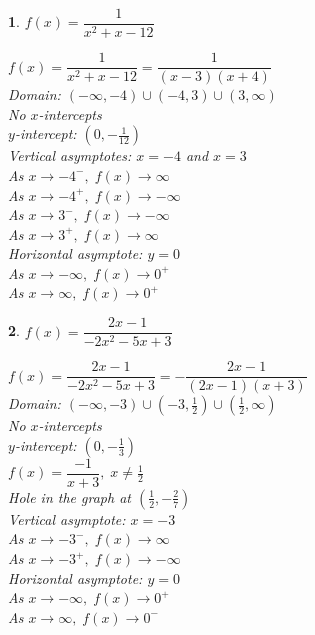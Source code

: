 \documentclass{amsbook}
\newtheorem{exc}{}
\newenvironment{ex}{\begin{exc}\normalfont}{\end{exc}}
\numberwithin{section}{chapter}
\numberwithin{equation}{chapter}
\begin{document}
\begin{multicols}{2}
\begin{ex}
	$f(x) = \dfrac{1}{x^{2} + x - 12}$
	\begin{sol}
		$f(x) = \dfrac{1}{x^{2} + x - 12} = \dfrac{1}{(x - 3)(x + 4)}$\\
		Domain: $(-\infty, -4) \cup (-4, 3) \cup (3, \infty)$\\
		No $x$-intercepts\\
		$y$-intercept: $(0, -\frac{1}{12})$\\
		Vertical asymptotes: $x = -4$ and $x = 3$\\
		As $x \rightarrow -4^{-}, \; f(x) \rightarrow \infty$\\
		As $x \rightarrow -4^{+}, \; f(x) \rightarrow -\infty$\\
		As $x \rightarrow 3^{-}, \; f(x) \rightarrow -\infty$\\
		As $x \rightarrow 3^{+}, \; f(x) \rightarrow \infty$\\
		Horizontal asymptote: $y = 0$\\
		As $x \rightarrow -\infty, \; f(x) \rightarrow 0^{+}$\\
		As $x \rightarrow \infty, \; f(x) \rightarrow 0^{+}$
	\end{sol}
\end{ex}

\begin{ex}
		$f(x) = \dfrac{2x - 1}{-2x^{2} - 5x + 3}$
	\begin{sol}
		$f(x) = \dfrac{2x - 1}{-2x^{2} - 5x + 3} = -\dfrac{2x - 1}{(2x - 1)(x + 3)}$\\
		Domain: $(-\infty, -3) \cup (-3, \frac{1}{2}) \cup (\frac{1}{2}, \infty)$\\
		No $x$-intercepts\\
		$y$-intercept: $(0, -\frac{1}{3})$\\
		$f(x) = \dfrac{-1}{x + 3}, \; x \neq \frac{1}{2}$\\
		Hole in the graph at $(\frac{1}{2}, -\frac{2}{7})$\\
		Vertical asymptote: $x = -3$\\
		As $x \rightarrow -3^{-}, \; f(x) \rightarrow \infty$\\
		As $x \rightarrow -3^{+}, \; f(x) \rightarrow -\infty$\\
		Horizontal asymptote: $y = 0$\\
		As $x \rightarrow -\infty, \; f(x) \rightarrow 0^{+}$\\
		As $x \rightarrow \infty, \; f(x) \rightarrow 0^{-}$
	\end{sol}
\end{ex}


\end{multicols}
\end{document}
